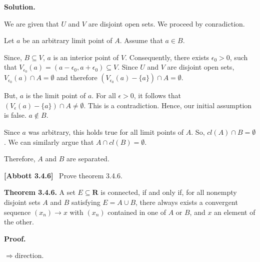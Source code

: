 \documentclass[10pt]{article}
\begin{document}
\textbf{Solution.}



We are given that $\displaystyle U$ and $\displaystyle V$ are disjoint open sets. We proceed by conradiction. 



Let $\displaystyle a$ be an arbitrary limit point of $\displaystyle A$. Assume that $\displaystyle a\in B$.



Since, $\displaystyle B\subseteq V$, $\displaystyle a$ is an interior point of $\displaystyle V$. Consequently, there exists $\displaystyle \epsilon _{0}  >0$, such that $\displaystyle V_{\epsilon _{0}}( a) =( a-\epsilon _{0} ,a+\epsilon _{0}) \subseteq V$. Since $\displaystyle U$ and $\displaystyle V$ are disjoint open sets, $\displaystyle V_{\epsilon _{0}}( a) \cap A=\emptyset $ and therefore $\displaystyle ( V_{\epsilon _{0}}( a) -\{a\}) \cap A=\emptyset $.



But, $\displaystyle a$ is the limit point of $\displaystyle a$. For all $\displaystyle \epsilon  >0$, it follows that $\displaystyle ( V_{\epsilon }( a) -\{a\}) \cap A\neq \emptyset $. This is a contradiction. Hence, our initial assumption is false. $\displaystyle a\notin B$. 



Since $\displaystyle a$ was arbitrary, this holds true for all limit points of $\displaystyle A$. So, $\displaystyle cl( A) \cap B=\emptyset $. We can similarly argue that $\displaystyle A\cap cl( B) =\emptyset $.



Therefore, $\displaystyle A$ and $\displaystyle B$ are separated.



\textbf{[Abbott 3.4.6]} \ Prove theorem 3.4.6.



\textbf{Theorem 3.4.6.} A set $\displaystyle E\subseteq \mathbf{R}$ is connected, if and only if, for all nonempty disjoint sets $\displaystyle A$ and $\displaystyle B$ satisfying $\displaystyle E=A\cup B$, there always exists a convergent sequence $\displaystyle ( x_{n})\rightarrow x$ with $\displaystyle ( x_{n})$ contained in one of $\displaystyle A$ or $\displaystyle B$, and $\displaystyle x$ an element of the other.



\textbf{Proof.}



$\displaystyle \Longrightarrow $direction.
\end{document}
